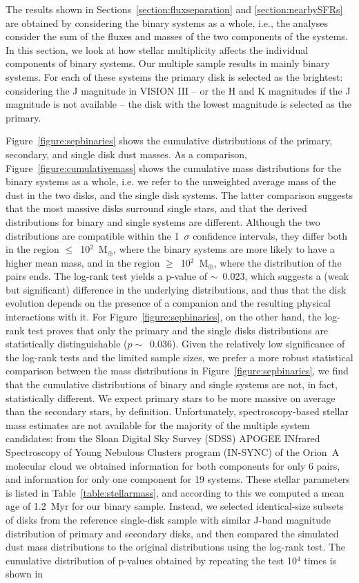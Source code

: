 \documentclass{aa}
\begin{document}
The results shown in Sections~\ref{section:fluxseparation} and \ref{section:nearbySFRs} are obtained by considering the binary systems as a whole, i.e., the analyses consider the sum of the fluxes and masses of the two components of the systems. In this section, we look at how stellar multiplicity affects the individual components of binary systems. Our multiple sample results in mainly binary systems. For each of these systems the primary disk is selected as the brightest: considering the J magnitude in VISION III -- or the H and K magnitudes if the J magnitude is not available -- the disk with the lowest magnitude is selected as the primary. \par
Figure~\ref{figure:sepbinaries} shows the cumulative distributions of the primary, secondary, and single disk dust masses. As a comparison, Figure~\ref{figure:cumulativemass} shows the cumulative mass distributions for the binary systems as a whole, i.e. we refer to the unweighted average mass of the dust in the two disks, and the single disk systems. The latter comparison suggests that the most massive disks surround single stars, and that the derived distributions for binary and single systems are different. Although the two distributions are compatible within the 1~$\sigma$ confidence intervals, they differ both in the region $\leq$~10$^2$~M$_{\oplus}$, where the binary systems are more likely to have a higher mean mass, and in the region $\geq$~10$^2$~M$_{\oplus}$, where the distribution of the pairs ends. The log-rank test yields a p-value of $\sim$~0.023, which suggests a (weak but significant) difference in the underlying distributions, and thus that the disk evolution depends on the presence of a companion and the resulting physical interactions with it. For Figure~\ref{figure:sepbinaries}, on the other hand, the log-rank test proves that only the primary and the single disks distributions are statistically distinguishable ($p \sim$~0.036). Given the relatively low significance of the log-rank tests and the limited sample sizes, we prefer a more robust statistical comparison between the mass distributions in Figure~\ref{figure:sepbinaries}, we find that the cumulative distributions of binary and single systems are not, in fact, statistically different. We expect primary stars to be more massive on average than the secondary stars, by definition. Unfortunately, spectroscopy-based stellar mass estimates are not available for the majority of the multiple system candidates: from the Sloan Digital Sky Survey (SDSS) APOGEE INfrared Spectroscopy of Young Nebulous Clusters program (IN-SYNC) of the Orion~A molecular cloud \citep{DaRio} we obtained information for both components for only 6 pairs, and information for only one component for 19 systems. These stellar parameters is listed in Table~\ref{table:stellarmass}, and according to this we computed a mean age of 1.2~Myr for our binary sample. Instead, we selected identical-size subsets of disks from the reference single-disk sample with similar J-band magnitude distribution of primary and secondary disks, and then compared the simulated dust mass distributions to the original distributions using the log-rank test. The cumulative distribution of p-values obtained by repeating the test 10$^4$ times is shown in 
\end{document}
